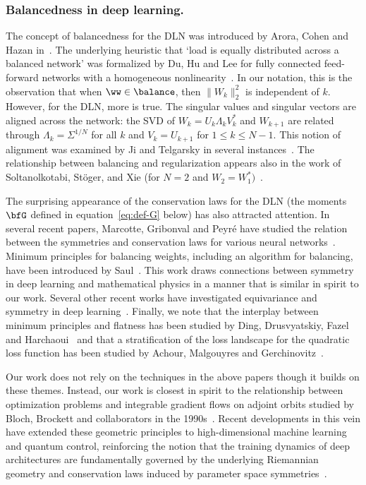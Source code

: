 \subsubsection{Balancedness in deep learning.\/} 
The concept of balancedness for the DLN was introduced by Arora, Cohen and Hazan in~\cite{ACH}. The underlying heuristic that `load is equally distributed across a balanced network' was formalized by Du, Hu and Lee for fully connected feed-forward networks with a homogeneous nonlinearity~\cite[Theorem 2.1]{JasonLee}. In our notation, this is the observation that when $\ww \in \balance$, then $\|W_k\|_2^2$ is independent of $k$. However, for the DLN, more is true. The singular values and singular vectors are aligned across the network: the SVD of $W_k = U_k \Lambda_k V_k^*$ and $W_{k+1}$ are related through $\Lambda_k=\Sigma^{1/N}$ for all $k$ and $V_k=U_{k+1}$ for $1\leq k \leq N-1$. This notion of alignment was examined by Ji and Telgarsky in several instances~\cite{Telgarsky}. The relationship between balancing and regularization appears also in the work of Soltanolkotabi, St{\"o}ger, and Xie (for $N=2$ and $W_2=W_1^*)$~\cite{SSX}. 

The surprising appearance of the conservation laws for the DLN (the moments $\bfG$ defined in equation~\eqref{eq:def-G} below) has also attracted attention. In several recent papers, Marcotte, Gribonval and Peyr\'{e}\/ have studied the relation between the symmetries and conservation laws for various neural networks~\cite{Peyre1,Peyre2,Peyre3}. Minimum principles for balancing weights, including an algorithm for balancing, have been introduced by Saul~\cite{Saul}. This work draws connections between symmetry in deep learning and mathematical physics in a manner that is similar in spirit to our work. Several other recent works have investigated equivariance and symmetry in deep learning~\cite{Kunin1,Tanaka-Kunin,Walters}. Finally, we note that the interplay between minimum principles and flatness has been studied by Ding, Drusvyatskiy, Fazel and Harchaoui~\cite{DDFH} and that a stratification of the loss landscape for the quadratic loss function has been studied by Achour, Malgouyres and Gerchinovitz~\cite{Achour}.

Our work does not rely on the techniques in the above papers though it builds on these themes. Instead, our work is closest in spirit to the relationship between optimization problems and integrable gradient flows on adjoint orbits studied by Bloch, Brockett and collaborators in the 1990s~\cite{Bloch1994,BBR}. Recent developments in this vein have extended these geometric principles to high-dimensional machine learning and quantum control, reinforcing the notion that the training dynamics of deep architectures are fundamentally governed by the underlying Riemannian geometry and conservation laws induced by parameter space symmetries~\cite{wang2024dynamical}.

